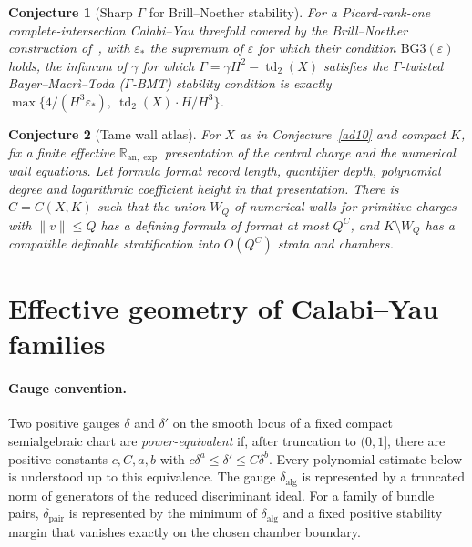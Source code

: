 \documentclass[11pt]{article}
\newtheorem{conjecture}{Conjecture}
\theoremstyle{definition}
\begin{document}
\begin{conjecture}[Sharp $\Gamma$ for Brill--Noether stability]\label{ad11}
For a Picard-rank-one complete-intersection Calabi--Yau threefold covered by the Brill--Noether construction of~\cite{FKLR25}, with $\varepsilon_*$ the supremum of $\varepsilon$ for which their condition $\mathrm{BG3}(\varepsilon)$ holds, the infimum of $\gamma$ for which $\Gamma=\gamma H^2-\operatorname{td}_2(X)$ satisfies the $\Gamma$-twisted Bayer--Macr\`i--Toda ($\Gamma$-BMT) stability condition is exactly $\max\{4/(H^3\varepsilon_*),\ \operatorname{td}_2(X)\cdot H/H^3\}$.
\end{conjecture}

\begin{conjecture}[Tame wall atlas]\label{ad12}
For $X$ as in Conjecture~\ref{ad10} and compact $K$, fix a finite effective $\mathbb R_{\mathrm{an},\exp}$ presentation of the central charge and the numerical wall equations.  Let formula format record length, quantifier depth, polynomial degree and logarithmic coefficient height in that presentation.  There is $C=C(X,K)$ such that the union $W_Q$ of numerical walls for primitive charges with $\|v\|\le Q$ has a defining formula of format at most $Q^C$, and $K\setminus W_Q$ has a compatible definable stratification into $O(Q^C)$ strata and chambers.
\end{conjecture}

\section{Effective geometry of Calabi--Yau families}

\paragraph{Gauge convention.}
Two positive gauges $\delta$ and $\delta'$ on the smooth locus of a fixed compact semialgebraic chart are \emph{power-equivalent} if, after truncation to $(0,1]$, there are positive constants $c,C,a,b$ with $c\delta^a\le\delta'\le C\delta^b$.  Every polynomial estimate below is understood up to this equivalence.  The gauge $\delta_{\mathrm{alg}}$ is represented by a truncated norm of generators of the reduced discriminant ideal.  For a family of bundle pairs, $\delta_{\mathrm{pair}}$ is represented by the minimum of $\delta_{\mathrm{alg}}$ and a fixed positive stability margin that vanishes exactly on the chosen chamber boundary.
\end{document}

